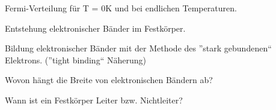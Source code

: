 \documentclass[a5paper,12pt,ngerman,print,grid=front]{kartei}
\begin{document}
	\begin{karte}{
		Fermi-Verteilung für T = 0K und bei endlichen Temperaturen.
		}
          
          
          
    \end{karte}


	\begin{karte}{
		Entstehung elektronischer Bänder im Festkörper.
		}
          
          
          
    \end{karte}


	\begin{karte}{
		Bildung elektronischer Bänder mit der Methode des ”stark gebundenen“ Elektrons. 
        (”tight binding“ Näherung)
		}
          
          
          
    \end{karte}


	\begin{karte}{
		Wovon hängt die Breite von elektronischen Bändern ab?
		}
          
          
          
    \end{karte}


	\begin{karte}{
		Wann ist ein Festkörper Leiter bzw. Nichtleiter?
		}
          
          
          
    \end{karte}

\end{document}
